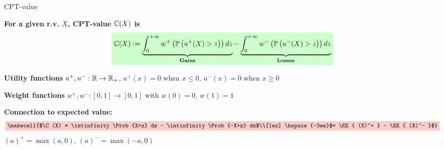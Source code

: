 \documentclass{beamer}
\begin{document}
\begin{frame}{CPT-value}
\begin{small}

\textbf{\small\color{bleu1} For a given r.v. $X$, CPT-value $\mathbb{C}(X)$ is}
\begin{align*}
\tikz[baseline]{
            \node[fill=green!20,anchor=base] (t1)
            {$\C(X):= \underbrace{\intinfinity w^+\left(\Prob{u^+(X)>z}\right) dz}_{\textbf{Gains}} - \underbrace{\intinfinity w^-\left(\Prob{u^-(X)>z}\right) dz}_{\textbf{Losses}}$};        }
\end{align*}
\begin{scriptsize}
\alert{\textbf{Utility functions}} $u^+,u^-:\mathbb{R}\rightarrow \mathbb{R}_+$, $u^+(x)=0$ when $x\le 0$, $u^-(x)=0$ when $x\ge 0$

\alert{\textbf{Weight functions}} $w^+,w^-:[0,1] \rightarrow [0,1]$ with $w(0)=0$, $w(1)=1$
\end{scriptsize}

\pause
\vspace{2ex}

\textbf{\small\color{rouge2} Connection to expected value:} 
\begin{align*}
\tikz[baseline]{
            \node[fill=red!20,anchor=base] (t1)
            {\makecell{$\C(X) = \intinfinity \Prob{X>z} dz -  \intinfinity \Prob{-X>z} dz$\\[1ex]
						\hspace{-3em}$= \EE{ (X)^+ } - \EE{ (X)^- }$}};
        }
\end{align*}
{\scriptsize$(a)^+ = \max(a,0)$, $(a)^- = \max(-a,0)$}
\end{small}



\end{frame}
\end{document}
